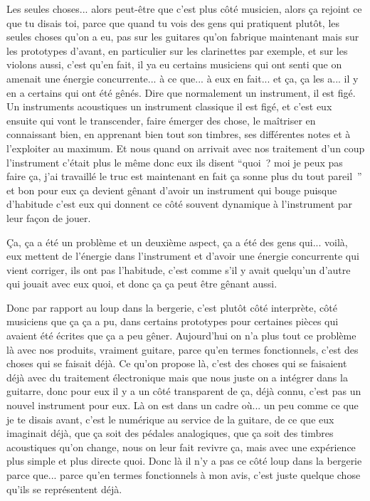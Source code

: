 Les seules choses... alors peut-être que c'est plus côté musicien, alors ça rejoint ce que tu disais toi, parce que quand tu vois des gens qui pratiquent plutôt, les seules choses qu'on a eu, pas sur les guitares qu'on fabrique maintenant mais sur les prototypes d'avant, en particulier sur les clarinettes par exemple, et sur les violons aussi, c'est qu'en fait, il ya eu certains musiciens qui ont senti que on amenait une énergie concurrente... à ce que... à eux en fait... et ça, ça les a...  il y en a certains qui ont été gênés. Dire que normalement un instrument, il est figé. Un  instruments acoustiques un instrument classique il est figé, et c'est eux ensuite qui vont le transcender, faire émerger des chose, le maîtriser en connaissant bien, en apprenant bien tout son timbres, ses différentes notes et à l'exploiter au maximum. Et nous quand on arrivait avec nos traitement d'un coup l'instrument c'était plus le même donc eux ils disent “quoi ? moi je peux pas faire ça, j'ai travaillé le truc est maintenant en fait ça sonne plus du tout pareil ” et bon pour eux ça devient gênant d'avoir un instrument qui bouge  puisque d'habitude c'est eux qui donnent ce côté souvent dynamique à l'instrument par leur façon de jouer. 

Ça, ça a été un problème et un deuxième aspect, ça a été des gens qui... voilà, eux mettent de l'énergie dans l'instrument et d'avoir une énergie concurrente qui vient corriger, ils ont pas l'habitude, c'est comme s'il y avait quelqu'un d'autre qui jouait avec eux quoi, et donc ça ça peut être gênant aussi. 

Donc par rapport au loup dans la bergerie, c'est plutôt côté interprète, côté musiciens que ça ça a pu, dans certains prototypes pour certaines pièces qui avaient été écrites que ça a peu gêner. 
Aujourd'hui on n'a plus tout ce problème là avec nos produits, vraiment guitare, parce qu'en termes fonctionnels, c'est des choses qui se faisait déjà. Ce qu'on propose là, c'est des choses qui se faisaient déjà avec du traitement électronique mais que nous juste on a intégrer dans la guitarre, donc pour eux il y a un côté transparent de ça, déjà connu, c'est pas un nouvel instrument pour eux. Là on est dans un cadre où... un peu comme ce que je te disais avant, c'est le numérique au service de la guitare, de ce que eux imaginait déjà, que ça soit des pédales analogiques, que ça soit des timbres acoustiques qu'on change, nous on leur fait revivre ça, mais avec une expérience plus simple et plus directe quoi. 
Donc là il n'y a pas ce côté loup dans la bergerie parce que... parce qu'en termes fonctionnels à mon avis, c'est juste quelque chose qu'ils se représentent déjà. 

